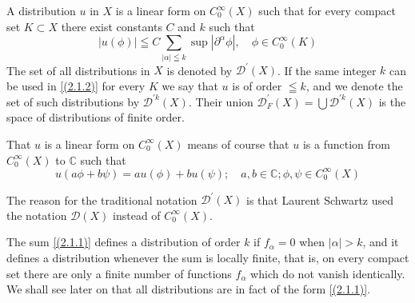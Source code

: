 \begin{defi}
    A distribution $u$ in $X$ is a linear form on $C_{0}^{\infty}(X)$ such that for every compact set $K \subset X$ there exist constants $C$ and $k$ such that
\begin{equation}
    \label{(2.1.2)}
|u(\phi)| \leqq C \sum_{|\alpha| \leqq k} \sup \left|\partial^{\alpha} \phi\right|, \quad \phi \in C_{0}^{\infty}(K) 
\end{equation}
The set of all distributions in $X$ is denoted by $\mathscr{D}^{\prime}(X)$. If the same integer $k$ can be used in \eqref{(2.1.2)} for every $K$ we say that $u$ is of order $\leqq k$, and we denote the set of such distributions by $\mathscr{D}^{\prime k}(X)$. Their union $\mathscr{D}_{F}^{\prime}(X)=\bigcup \mathscr{D}^{\prime k}(X)$ is the space of distributions of finite order.
\end{defi}
That $u$ is a linear form on $C_{0}^{\infty}(X)$ means of course that $u$ is a function from $C_{0}^{\infty}(X)$ to $\mathbb{C}$ such that
\[
u(a \phi+b \psi)=a u(\phi)+b u(\psi) ; \quad a, b \in \mathbb{C} ; \phi, \psi \in C_{0}^{\infty}(X)
\]
\begin{remark}
    The reason for the traditional notation $\mathscr{D}^{\prime}(X)$ is that Laurent Schwartz used the notation $\mathscr{D}(X)$ instead of $C_{0}^{\infty}(X)$.
\end{remark}

The sum \eqref{(2.1.1)} defines a distribution of order $k$ if $f_{\alpha}=0$ when $|\alpha|>k$, and it defines a distribution whenever the sum is locally finite, that is, on every compact set there are only a finite number of functions $f_{\alpha}$ which do not vanish identically. We shall see later on that all distributions are in fact of the form \eqref{(2.1.1)}.

